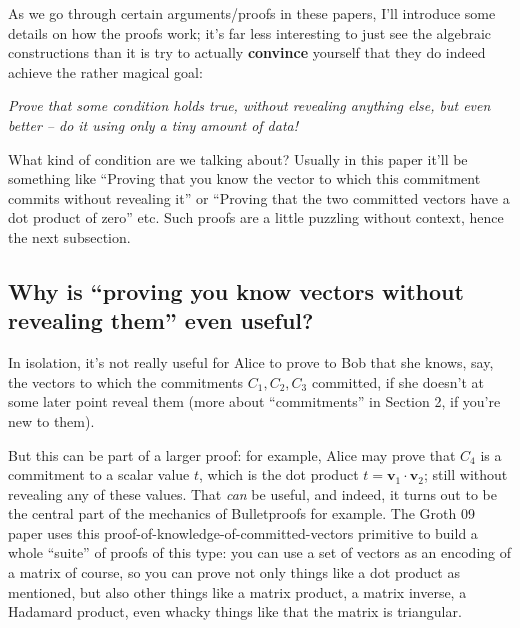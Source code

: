 \documentclass[10pt,a4paper]{article}
\begin{document}
As we go through certain arguments/proofs in these papers, I'll
introduce some details on how the proofs work; it's far less interesting
to just see the algebraic constructions than it is try to actually
\textbf{convince} yourself that they do indeed achieve the rather
magical goal:

\emph{Prove that some condition holds true, without revealing anything
else, but even better -- do it using only a tiny amount of data!}

What kind of condition are we talking about? Usually in this paper it'll
be something like ``Proving that you know the vector to which this
commitment commits without revealing it'' or ``Proving that the two
committed vectors have a dot product of zero'' etc. Such proofs are a
little puzzling without context, hence the next subsection.

\hypertarget{why-is-proving-you-know-vectors-without-revealing-them-even-useful}{%
\subsection[Why is ``proving you know vectors without revealing them''
even useful?]{\texorpdfstring{\protect\hypertarget{anchor-9}{}{}Why is
``proving you know vectors without revealing them'' even
useful?}{Why is ``proving you know vectors without revealing them'' even useful?}}\label{why-is-proving-you-know-vectors-without-revealing-them-even-useful}}

In isolation, it's not really useful for Alice to prove to Bob that she
knows, say, the vectors to which the commitments $C_1, C_2, C_3$ committed, if she
doesn't at some later point reveal them (more about ``commitments'' in
Section 2, if you're new to them).

But this can be part of a larger proof: for example, Alice may prove
that $C_4$ is a commitment to a scalar value $t$, which is the dot product $t=\textbf{v}_1 \cdot \textbf{v}_2$; still
without revealing any of these values. That \emph{can} be useful, and
indeed, it turns out to be the central part of the mechanics of
Bulletproofs for example. The Groth 09 paper uses this
proof-of-knowledge-of-committed-vectors primitive to build a whole
``suite'' of proofs of this type: you can use a set of vectors as an
encoding of a matrix of course, so you can prove not only things like a
dot product as mentioned, but also other things like a matrix product, a
matrix inverse, a Hadamard product, even whacky things like that the
matrix is triangular.
\end{document}
